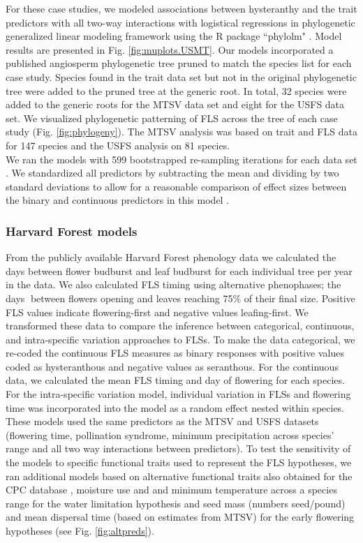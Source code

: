 \documentclass[11pt]{article}
\begin{document}
\noindent For these case studies, we modeled associations between hysteranthy and the trait predictors with all two-way interactions with logistical regressions in phylogenetic generalized linear modeling framework \citep{Ives2010} using the R package ``phylolm" \citep{Ho2014}. Model results are presented in Fig. \ref{fig:muplots.USMT}. Our models incorporated a published angiosperm phylogenetic tree \citep{Zanne2013} pruned to match the species list for each case study. Species found in the trait data set but not in the original phylogenetic tree were added to the pruned tree at the generic root. In total, 32 species were added to the generic roots for the MTSV data set and eight for the USFS data set. We visualized phylogenetic patterning of FLS across the tree of each case study (Fig. \ref{fig:phylogeny}). The MTSV analysis was based on trait and FLS data for 147 species and the USFS analysis on 81 species. \\

\noindent We ran the models with 599 bootstrapped re-sampling iterations for each data set \citep{Wilcox2010}. We standardized all predictors by subtracting the mean and dividing by two standard deviations to allow for a reasonable comparison of effect sizes between the binary and continuous predictors in this model \citep{Gelman2007}. 


\subsubsection*{Harvard Forest models}
\noindnent From the publicly available Harvard Forest phenology data \citep{OKeefe2015} we calculated the days between flower budburst and leaf budburst for each individual tree per year in the data. We also calculated FLS timing using alternative phenophases; the days between flowers opening and leaves reaching 75\% of their final size. Positive FLS values indicate flowering-first and negative values leafing-first. We transformed these data to compare the inference between categorical, continuous, and intra-specific variation approaches to FLSs. To make the data categorical, we re-coded the continuous FLS measures as binary responses with positive values coded as hysteranthous and negative values as seranthous. For the continuous data, we calculated the mean FLS timing and day of flowering for each species. For the intra-specific variation model, individual variation in FLSs and flowering time was incorporated into the model as a random effect nested within species. These models used the same predictors as the MTSV and USFS datasets (flowering time, pollination syndrome, minimum precipitation across species' range and all two way interactions between predictors). To test the sensitivity of the models to specific functional traits used to represent the FLS hypotheses, we ran additional models based on alternative functional traits also obtained for the CPC database \citep{usdancrs}, moisture use and and minimum temperature across a species range for the water limitation hypothesis and seed mass (numbers seed/pound) and mean dispersal time (based on estimates from MTSV) for the early flowering hypotheses (see Fig. \ref{fig:altpreds}).\\
\end{document}
